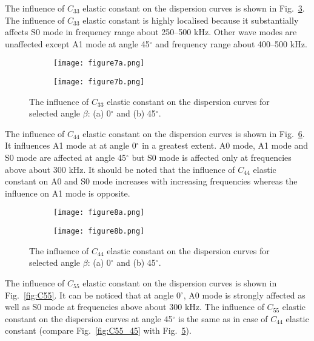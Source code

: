 \documentclass[preprint,12pt]{elsarticle}
\begin{document}
 The influence of \(C_{33}\) elastic constant on the dispersion curves is shown in Fig.~\ref{fig:C33}.
 The influence of \(C_{33}\) elastic constant is highly localised because it substantially affects S0 mode in frequency range about 250--500 kHz.
 Other wave modes are unaffected except A1 mode at angle  45\(^{\circ}\) and frequency  range about 400--500 kHz.
 
\begin{figure} [h!]
	\centering
	\begin{subfigure}[b]{0.47\textwidth}
		\centering
		\texttt{[image: figure7a.png]}
		\caption{}
		\label{fig:C33_0}
	\end{subfigure}
	\hfill
	\begin{subfigure}[b]{0.47\textwidth}
		\centering
		\texttt{[image: figure7b.png]}
		\caption{}
		\label{fig:C33_45}
	\end{subfigure}
 	\caption{The influence of \(C_{33}\) elastic constant on the dispersion curves for selected angle \(\beta\): (a) 0\(^{\circ}\) and (b) 45\(^{\circ}\).} 
	\label{fig:C33}
\end{figure}

 The influence of \(C_{44}\) elastic constant on the dispersion curves is shown in Fig.~\ref{fig:C44}.
 It influences A1 mode at at angle  0\(^{\circ}\) in a greatest extent.
 A0 mode, A1 mode and S0 mode are affected at angle 45\(^{\circ}\) but S0 mode is affected only at frequencies above about 300 kHz.
 It should be noted that the influence of \(C_{44}\) elastic constant on A0 and S0 mode increases with increasing frequencies whereas the influence on A1 mode is opposite.
 
\begin{figure} [h!]
	\centering
	\begin{subfigure}[b]{0.47\textwidth}
		\centering
		\texttt{[image: figure8a.png]}
		\caption{}
		\label{fig:C44_0}
	\end{subfigure}
	\hfill
	\begin{subfigure}[b]{0.47\textwidth}
		\centering
		\texttt{[image: figure8b.png]}
		\caption{}
		\label{fig:C44_45}
	\end{subfigure}
 	\caption{The influence of \(C_{44}\) elastic constant on the dispersion curves for selected angle \(\beta\): (a) 0\(^{\circ}\) and (b) 45\(^{\circ}\).} 
	\label{fig:C44}
\end{figure}

 The influence of \(C_{55}\) elastic constant on the dispersion curves is shown in Fig.~\ref{fig:C55}.
 It can be noticed that at angle 0\(^{\circ}\), A0 mode is strongly affected as well as S0 mode at frequencies above about 300 kHz.
 The influence of \(C_{55}\) elastic constant on the dispersion curves at angle 45\(^{\circ}\) is the same as in case of  \(C_{44}\) elastic constant (compare Fig.~\ref{fig:C55_45} with Fig.~\ref{fig:C44_45}).
 
\end{document}

